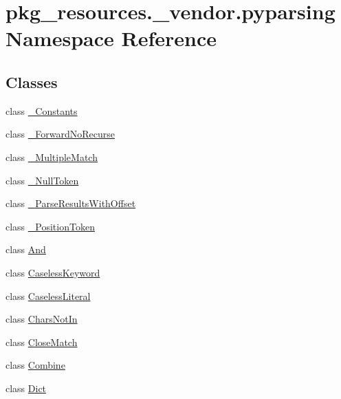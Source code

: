 \hypertarget{namespacepkg__resources_1_1__vendor_1_1pyparsing}{}\section{pkg\+\_\+resources.\+\_\+vendor.\+pyparsing Namespace Reference}
\label{namespacepkg__resources_1_1__vendor_1_1pyparsing}
\subsection*{Classes}
\begin{DoxyCompactItemize}
\item 
class \hyperlink{classpkg__resources_1_1__vendor_1_1pyparsing_1_1__Constants}{\+\_\+\+Constants}
\item 
class \hyperlink{classpkg__resources_1_1__vendor_1_1pyparsing_1_1__ForwardNoRecurse}{\+\_\+\+Forward\+No\+Recurse}
\item 
class \hyperlink{classpkg__resources_1_1__vendor_1_1pyparsing_1_1__MultipleMatch}{\+\_\+\+Multiple\+Match}
\item 
class \hyperlink{classpkg__resources_1_1__vendor_1_1pyparsing_1_1__NullToken}{\+\_\+\+Null\+Token}
\item 
class \hyperlink{classpkg__resources_1_1__vendor_1_1pyparsing_1_1__ParseResultsWithOffset}{\+\_\+\+Parse\+Results\+With\+Offset}
\item 
class \hyperlink{classpkg__resources_1_1__vendor_1_1pyparsing_1_1__PositionToken}{\+\_\+\+Position\+Token}
\item 
class \hyperlink{classpkg__resources_1_1__vendor_1_1pyparsing_1_1And}{And}
\item 
class \hyperlink{classpkg__resources_1_1__vendor_1_1pyparsing_1_1CaselessKeyword}{Caseless\+Keyword}
\item 
class \hyperlink{classpkg__resources_1_1__vendor_1_1pyparsing_1_1CaselessLiteral}{Caseless\+Literal}
\item 
class \hyperlink{classpkg__resources_1_1__vendor_1_1pyparsing_1_1CharsNotIn}{Chars\+Not\+In}
\item 
class \hyperlink{classpkg__resources_1_1__vendor_1_1pyparsing_1_1CloseMatch}{Close\+Match}
\item 
class \hyperlink{classpkg__resources_1_1__vendor_1_1pyparsing_1_1Combine}{Combine}
\item 
class \hyperlink{classpkg__resources_1_1__vendor_1_1pyparsing_1_1Dict}{Dict}
\item 

\end{DoxyCompactItemize}
